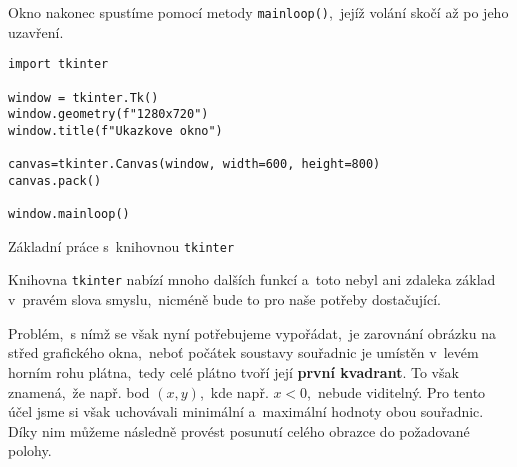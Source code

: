 Okno nakonec spustíme pomocí metody \texttt{mainloop()},~jejíž volání skočí až po jeho uzavření.
\begin{program}[h]
\begin{lstlisting}[style=python]
import tkinter

window = tkinter.Tk()
window.geometry(f"1280x720")
window.title(f"Ukazkove okno")

canvas=tkinter.Canvas(window, width=600, height=800)
canvas.pack()

window.mainloop()
\end{lstlisting}
    \caption{Základní práce s~knihovnou \texttt{tkinter}}
    \label{prog:tkinter-zaklad}
\end{program}

Knihovna \texttt{tkinter} nabízí mnoho dalších funkcí a~toto nebyl ani zdaleka základ v~pravém slova smyslu,~nicméně bude to pro naše potřeby dostačující.

Problém,~s nímž se však nyní potřebujeme vypořádat,~je zarovnání obrázku na střed grafického okna,~neboť počátek soustavy souřadnic je umístěn v~levém horním rohu plátna,~tedy celé plátno tvoří její \textbf{první kvadrant}. To však znamená,~že např. bod $(x,y)$,~kde např. $x<0$,~nebude viditelný. Pro tento účel jsme si však uchovávali minimální a~maximální hodnoty obou souřadnic. Díky nim můžeme následně provést posunutí celého obrazce do požadované polohy.

